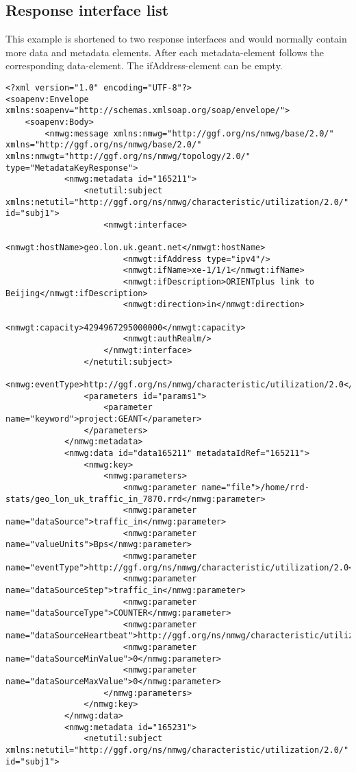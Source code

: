 \documentclass[a4paper,12pt,titlepage,hidelinks,fleqn]{article}
\begin{document}
\subsection{Response interface list}
\begin{flushleft}
This example is shortened to two response interfaces and would normally contain more data and metadata elements.
After each metadata-element follows  the corresponding data-element. The ifAddress-element can be empty.
\begin{framed}
\begin{lstlisting}
<?xml version="1.0" encoding="UTF-8"?>
<soapenv:Envelope xmlns:soapenv="http://schemas.xmlsoap.org/soap/envelope/">
	<soapenv:Body>
		<nmwg:message xmlns:nmwg="http://ggf.org/ns/nmwg/base/2.0/" xmlns="http://ggf.org/ns/nmwg/base/2.0/" xmlns:nmwgt="http://ggf.org/ns/nmwg/topology/2.0/" type="MetadataKeyResponse">
			<nmwg:metadata id="165211">
				<netutil:subject xmlns:netutil="http://ggf.org/ns/nmwg/characteristic/utilization/2.0/" id="subj1">
					<nmwgt:interface>
						<nmwgt:hostName>geo.lon.uk.geant.net</nmwgt:hostName>
						<nmwgt:ifAddress type="ipv4"/>
						<nmwgt:ifName>xe-1/1/1</nmwgt:ifName>
						<nmwgt:ifDescription>ORIENTplus link to Beijing</nmwgt:ifDescription>
						<nmwgt:direction>in</nmwgt:direction>
						<nmwgt:capacity>4294967295000000</nmwgt:capacity>
						<nmwgt:authRealm/>
					</nmwgt:interface>
				</netutil:subject>
				<nmwg:eventType>http://ggf.org/ns/nmwg/characteristic/utilization/2.0</nmwg:eventType>
				<parameters id="params1">
					<parameter name="keyword">project:GEANT</parameter>
				</parameters>
			</nmwg:metadata>
			<nmwg:data id="data165211" metadataIdRef="165211">
				<nmwg:key>
					<nmwg:parameters>
						<nmwg:parameter name="file">/home/rrd-stats/geo_lon_uk_traffic_in_7870.rrd</nmwg:parameter>
						<nmwg:parameter name="dataSource">traffic_in</nmwg:parameter>
						<nmwg:parameter name="valueUnits">Bps</nmwg:parameter>
						<nmwg:parameter name="eventType">http://ggf.org/ns/nmwg/characteristic/utilization/2.0</nmwg:parameter>
						<nmwg:parameter name="dataSourceStep">traffic_in</nmwg:parameter>
						<nmwg:parameter name="dataSourceType">COUNTER</nmwg:parameter>
						<nmwg:parameter name="dataSourceHeartbeat">http://ggf.org/ns/nmwg/characteristic/utilization/2.0</nmwg:parameter>
						<nmwg:parameter name="dataSourceMinValue">0</nmwg:parameter>
						<nmwg:parameter name="dataSourceMaxValue">0</nmwg:parameter>
					</nmwg:parameters>
				</nmwg:key>
			</nmwg:data>
			<nmwg:metadata id="165231">
				<netutil:subject xmlns:netutil="http://ggf.org/ns/nmwg/characteristic/utilization/2.0/" id="subj1">

\end{lstlisting}
\end{framed}
\end{flushleft}
\end{document}
